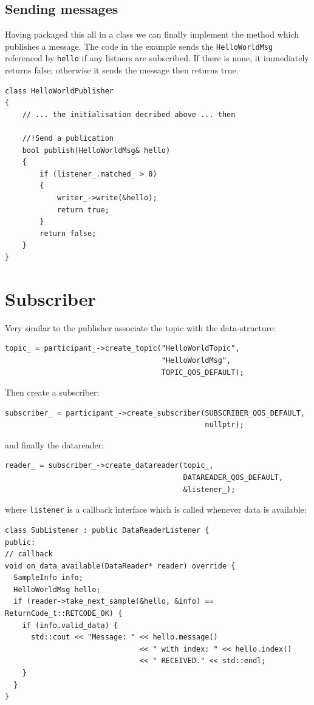 \documentclass[12pt]{report}
\begin{document}
\subsection{Sending messages}

Having packaged this all in a class we can finally implement the method
which publishes a message. The code in the example sends the
\texttt{HelloWorldMsg} referenced by \texttt{hello} if any listners are
subscribed. If there is none, it immediately returns false; otherwise
it sends the message then returns true.

\begin{verbatim}
class HelloWorldPublisher
{
    // ... the initialisation decribed above ... then
    
    //!Send a publication
    bool publish(HelloWorldMsg& hello)
    {
        if (listener_.matched_ > 0)
        {
            writer_->write(&hello);
            return true;
        }
        return false;
    }
}
\end{verbatim}


\section{Subscriber}
Very similar to the publisher associate the topic with the data-structure:
\begin{verbatim}
topic_ = participant_->create_topic("HelloWorldTopic",
                                    "HelloWorldMsg",
                                    TOPIC_QOS_DEFAULT);
\end{verbatim}

Then create a subscriber:
\begin{verbatim}
subscriber_ = participant_->create_subscriber(SUBSCRIBER_QOS_DEFAULT,
                                              nullptr);
\end{verbatim}

and finally the datareader:
\begin{verbatim}
reader_ = subscriber_->create_datareader(topic_,
                                         DATAREADER_QOS_DEFAULT,
                                         &listener_);
\end{verbatim}
where \texttt{listener} is a callback interface which is called whenever data is available:
\begin{verbatim}
class SubListener : public DataReaderListener {
public:
// callback
void on_data_available(DataReader* reader) override {
  SampleInfo info;
  HelloWorldMsg hello;
  if (reader->take_next_sample(&hello, &info) == ReturnCode_t::RETCODE_OK) {
    if (info.valid_data) {
      std::cout << "Message: " << hello.message()
                               << " with index: " << hello.index()
                               << " RECEIVED." << std::endl;
    }
  }
}
\end{verbatim}
\end{document}
